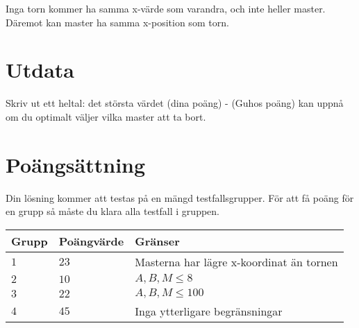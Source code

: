 Inga torn kommer ha samma x-värde som varandra, och inte heller master.
Däremot kan master ha samma x-position som torn.

\section*{Utdata}
Skriv ut ett heltal: det största värdet (dina poäng) - (Guhos poäng) kan uppnå om du optimalt väljer vilka master att ta bort.

\section*{Poängsättning}
Din lösning kommer att testas på en mängd testfallsgrupper.
För att få poäng för en grupp så måste du klara alla testfall i gruppen.

\noindent
\begin{tabular}{| l | l | p{12cm} |}
  \hline
  Grupp & Poängvärde & Gränser \\ \hline
  $1$   & $23$       & Masterna har lägre x-koordinat än tornen \\ \hline
  $2$   & $10$       & $A,B,M \leq 8$\\ \hline
  $3$   & $22$       & $A,B,M \leq 100$  \\ \hline
  $4$   & $45$       & Inga ytterligare begränsningar  \\ \hline
\end{tabular}
